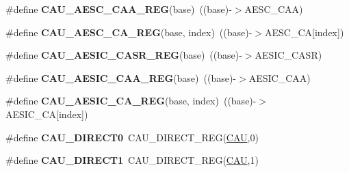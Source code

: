 \begin{DoxyCompactItemize}
\item 
\#define {\bfseries C\+A\+U\+\_\+\+A\+E\+S\+C\+\_\+\+C\+A\+A\+\_\+\+R\+EG}(base)~((base)-\/$>$A\+E\+S\+C\+\_\+\+C\+AA)\hypertarget{group__CAU__Register__Accessor__Macros_gab22ad099e36a2eec4af64bf79aaa4c45}{}\label{group__CAU__Register__Accessor__Macros_gab22ad099e36a2eec4af64bf79aaa4c45}

\item 
\#define {\bfseries C\+A\+U\+\_\+\+A\+E\+S\+C\+\_\+\+C\+A\+\_\+\+R\+EG}(base,  index)~((base)-\/$>$A\+E\+S\+C\+\_\+\+CA\mbox{[}index\mbox{]})\hypertarget{group__CAU__Register__Accessor__Macros_ga35cc9a69c57defc377319d4eac046f6c}{}\label{group__CAU__Register__Accessor__Macros_ga35cc9a69c57defc377319d4eac046f6c}

\item 
\#define {\bfseries C\+A\+U\+\_\+\+A\+E\+S\+I\+C\+\_\+\+C\+A\+S\+R\+\_\+\+R\+EG}(base)~((base)-\/$>$A\+E\+S\+I\+C\+\_\+\+C\+A\+SR)\hypertarget{group__CAU__Register__Accessor__Macros_gaa59b64b22ea64f2292ed80742f6bef55}{}\label{group__CAU__Register__Accessor__Macros_gaa59b64b22ea64f2292ed80742f6bef55}

\item 
\#define {\bfseries C\+A\+U\+\_\+\+A\+E\+S\+I\+C\+\_\+\+C\+A\+A\+\_\+\+R\+EG}(base)~((base)-\/$>$A\+E\+S\+I\+C\+\_\+\+C\+AA)\hypertarget{group__CAU__Register__Accessor__Macros_ga6ce686ca31f8188aeeaee41939735654}{}\label{group__CAU__Register__Accessor__Macros_ga6ce686ca31f8188aeeaee41939735654}

\item 
\#define {\bfseries C\+A\+U\+\_\+\+A\+E\+S\+I\+C\+\_\+\+C\+A\+\_\+\+R\+EG}(base,  index)~((base)-\/$>$A\+E\+S\+I\+C\+\_\+\+CA\mbox{[}index\mbox{]})\hypertarget{group__CAU__Register__Accessor__Macros_gac784d027048ac8f2ff93707a4cb8631b}{}\label{group__CAU__Register__Accessor__Macros_gac784d027048ac8f2ff93707a4cb8631b}

\item 
\#define {\bfseries C\+A\+U\+\_\+\+D\+I\+R\+E\+C\+T0}~C\+A\+U\+\_\+\+D\+I\+R\+E\+C\+T\+\_\+\+R\+EG(\hyperlink{group__CAU__Peripheral__Access__Layer_ga0e3e4bb9b7bb5ef30b07e8925c56b950}{C\+AU},0)\hypertarget{group__CAU__Register__Accessor__Macros_ga708cb48d6b678d3c5f8cdaab5eebaebe}{}\label{group__CAU__Register__Accessor__Macros_ga708cb48d6b678d3c5f8cdaab5eebaebe}

\item 
\#define {\bfseries C\+A\+U\+\_\+\+D\+I\+R\+E\+C\+T1}~C\+A\+U\+\_\+\+D\+I\+R\+E\+C\+T\+\_\+\+R\+EG(\hyperlink{group__CAU__Peripheral__Access__Layer_ga0e3e4bb9b7bb5ef30b07e8925c56b950}{C\+AU},1)\hypertarget{group__CAU__Register__Accessor__Macros_gabbde0bfe03c72ce8a12773d584514da8}{}\label{group__CAU__Register__Accessor__Macros_gabbde0bfe03c72ce8a12773d584514da8}


\end{DoxyCompactItemize}

